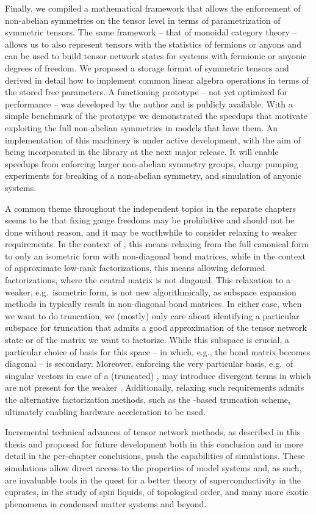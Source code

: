 Finally, we compiled a mathematical framework that allows the enforcement of non-abelian symmetries on the tensor level in terms of parametrization of symmetric tensors.
%
The same framework -- that of monoidal category theory -- allows us to also represent tensors with the statistics of fermions or anyons and can be used to build tensor network states for systems with fermionic or anyonic degrees of freedom.
%
We proposed a storage format of symmetric tensors and derived in detail how to implement common linear algebra operations in terms of the stored free parameters.
%
A functioning prototype -- not yet optimized for performance -- was developed by the author and is publicly available.
%
With a simple benchmark of the prototype we demonstrated the speedups that motivate exploiting the full non-abelian symmetries in models that have them.
%
An implementation of this machinery is under active development, with the aim of being incorporated in the  library at the next major release.
%
It will enable speedups from enforcing larger non-abelian symmetry groups, charge pumping experiments for breaking of a non-abelian symmetry, and simulation of anyonic systems.



A common theme throughout the independent topics in the separate chapters seems to be that fixing gauge freedoms may be prohibitive and should not be done without reason, and it may be worthwhile to consider relaxing to weaker requirements.
%
In the context of , this means relaxing from the full canonical form to only an isometric form with non-diagonal bond matrices, while in the context of approximate low-rank factorizations, this means allowing deformed factorizations, where the central matrix is not diagonal.
%
This relaxation to a weaker, e.g.~isometric form, is not new algorithmically, as subspace expansion methods in  typically result in non-diagonal bond matrices.
%
In either case, when we want to do truncation, we (mostly) only care about identifying a particular subspace for truncation that admits a good approximation of the tensor network state or of the matrix we want to factorize.
%
While this subspace is crucial, a particular choice of basis for this space -- in which, e.g., the  bond matrix becomes diagonal -- is secondary.
%
Moreover, enforcing the very particular basis, e.g.~of singular vectors in case of a (truncated) , may introduce divergent terms in  which are not present for the weaker .
%
Additionally, relaxing such requirements admits the alternative factorization methods, such as the -based truncation scheme, ultimately enabling hardware acceleration to be used.



Incremental technical advances of tensor network methods, as described in this thesis and proposed for future development both in this conclusion and in more detail in the per-chapter conclusions, push the capabilities of simulations.
%
These simulations allow direct access to the properties of model systems and, as such, are invaluable tools in the quest for a better theory of superconductivity in the cuprates, in the study of spin liquids, of topological order, and many more exotic phenomena in condensed matter systems and beyond.